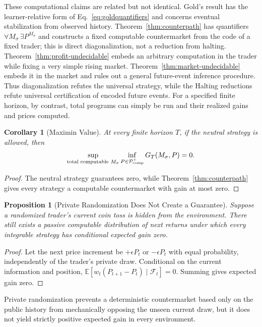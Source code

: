 \documentclass[aps,pra,reprint,superscriptaddress,amsmath,amssymb,floatfix]{revtex4-2}
\theoremstyle{plain}
\newtheorem{corollary}[theorem]{Corollary}
\newtheorem{proposition}[theorem]{Proposition}
\theoremstyle{definition}
\theoremstyle{remark}
\begin{document}
These computational claims are related but not identical. Gold's result has
the learner-relative form of Eq.~\eqref{eq:goldquantifiers} and concerns
eventual stabilization from observed history.
Theorem~\ref{thm:counterpath} has quantifiers
\(\forall M_\sigma\,\exists P^{M_\sigma}\) and constructs a fixed computable
countermarket from the code of a fixed trader; this is direct diagonalization,
not a reduction from halting. Theorem~\ref{thm:profit-undecidable} embeds an
arbitrary computation in the trader while fixing a very simple rising market.
Theorem~\ref{thm:market-undecidable} embeds it in the market and rules out a
general future-event inference procedure. Thus diagonalization refutes the
universal strategy, while the Halting reductions refute universal
certification of encoded future events. For a specified finite horizon, by
contrast, total programs can simply be run and their realized gains and prices
computed.

\begin{corollary}[Maximin Value]
  \label{cor:maximin}
  At every finite horizon \(T\), if the neutral strategy is allowed, then
  \[
    \sup_{\text{\rm total computable }M_\sigma}
    \inf_{P\in\mathcal P_{\mathrm{comp}}^{+}}
    G_T(M_\sigma,P)=0.
  \]
\end{corollary}

\begin{proof}
The neutral strategy guarantees zero, while
Theorem~\ref{thm:counterpath} gives every strategy a computable countermarket
with gain at most zero.
\end{proof}

\begin{proposition}[Private Randomization Does Not Create a Guarantee]
  \label{prop:randomized}
  Suppose a randomized trader's current coin toss is hidden from the
  environment. There still exists a passive computable distribution of next
  returns under which every integrable strategy has conditional expected gain
  zero.
\end{proposition}

\begin{proof}
Let the next price increment be \(+\epsilon P_t\) or \(-\epsilon P_t\) with
equal probability, independently of the trader's private draw. Conditional on
the current information and position,
\(\mathbb{E}[w_t(P_{t+1}-P_t)\mid\mathcal{F}_t]=0\).
Summing gives expected gain zero.
\end{proof}

Private randomization prevents a deterministic countermarket based only on the
public history from mechanically opposing the unseen current draw, but it does
not yield strictly positive expected gain in every environment.
\end{document}
